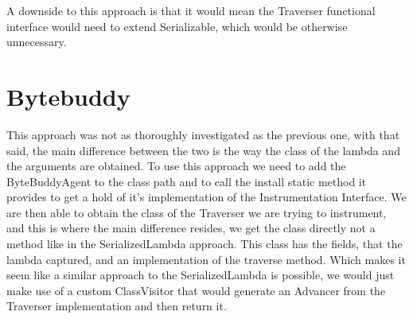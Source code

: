 A downside to this approach is that it would mean the Traverser functional interface would need to extend Serializable, which would be otherwise unnecessary.


\section{Bytebuddy}

This approach was not as thoroughly investigated as the previous one, with that said, the main difference between the two is the way the class of the lambda and the arguments are obtained. To use this approach we need to add the ByteBuddyAgent to the class path and to call the install static method it provides to get a hold of it's implementation of the Instrumentation Interface. We are then able to obtain the class of the Traverser we are trying to instrument, and this is where the main difference resides, we get the class directly not a method like in the SerializedLambda approach. This class has the fields, that the lambda captured, and an implementation of the traverse method. Which makes it seem like a similar approach to the SerializedLambda is possible, we would just make use of a custom ClassVisitor that would generate an Advancer from the Traverser implementation and then return it.
